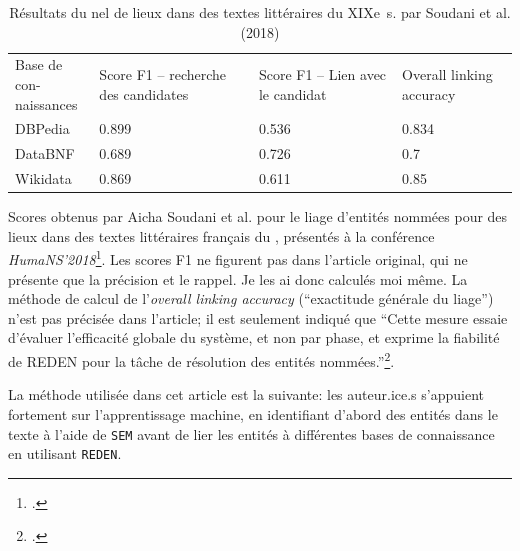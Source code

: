 \begin{table}[h]
	\centering
	\begin{tabular}{m{5cm}m{3cm}m{3cm}m{3cm}}
		\diagbox[innerwidth=5cm]{Score}{Base de con-\\naissances} & Score F1 -- recherche des candidates & Score F1 -- Lien avec le candidat & Overall linking accuracy \\
		DBPedia & 0.899 & 0.536 & 0.834 \\
		DataBNF & 0.689 & 0.726 & 0.7 \\
		Wikidata & 0.869 & 0.611 & 0.85 \\
	\end{tabular}
	\caption{Résultats du \gls{nel} de lieux dans des textes littéraires du XIXe~s. par Soudani et al. (2018)}
	\label{appendix:soudani}
\end{table}
Scores obtenus par Aicha Soudani et al. pour le liage d'entités nommées pour des lieux dans des textes littéraires français du , présentés à la conférence \textit{HumaNS’2018}\footcite[p. 4]{soudani_adaptation_2018}. Les scores F1 ne figurent pas dans l'article original, qui ne présente que la précision et le rappel. Je les ai donc calculés moi même. La méthode de calcul de l'\textit{overall linking accuracy} (\enquote{exactitude générale du liage}) n'est pas précisée dans l'article; il est seulement indiqué que \enquote{Cette mesure essaie d'évaluer l'efficacité globale du système, et non par phase, et exprime la fiabilité de REDEN pour la tâche de résolution des entités nommées.}\footcite[p. 4]{soudani_adaptation_2018}.

La méthode utilisée dans cet article est la suivante: les auteur.ice.s s'appuient fortement sur l'apprentissage machine, en identifiant d'abord des entités dans le texte à l'aide de \texttt{SEM} avant de lier les entités à différentes bases de connaissance en utilisant \texttt{REDEN}.



